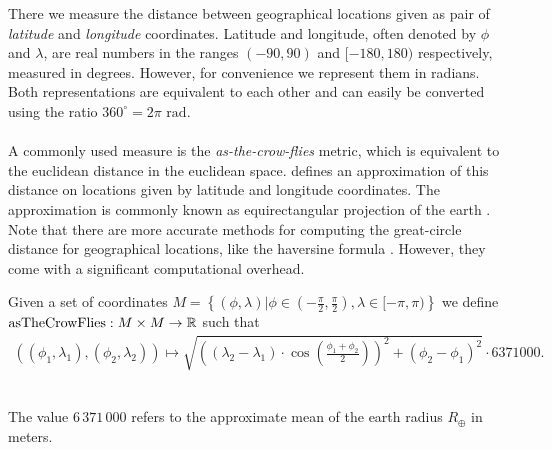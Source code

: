 	There we measure the distance between geographical locations given as pair of \textit{latitude} and \textit{longitude} coordinates.
	Latitude and longitude, often denoted by $\phi$ and $\lambda$, are real numbers in the ranges $(-90, 90)$ and $[-180, 180)$ respectively,
	measured in degrees. However, for convenience we represent them in radians. Both representations are equivalent to each other
	and can easily be converted using the ratio $360^\circ = 2 \pi \text{ rad}$.\\\\
	A commonly used measure is the \textit{as-the-crow-flies} metric, which is equivalent to the euclidean distance in the euclidean space.
	 defines an approximation of this distance on locations given by latitude and longitude coordinates.
	The approximation is commonly known as equirectangular projection of the earth .
	Note that there are more accurate methods for computing the great-circle distance for geographical locations,
	like the haversine formula . However, they come with a significant computational overhead.
	\begin{mydef}\label{asTheCrowFlies}
		Given a set of coordinates $M = \left\{(\phi, \lambda) | \phi \in \left(-\frac{\pi}{2}, \frac{\pi}{2}\right), \lambda \in [-\pi, \pi)\right\}$ we define
		$\operatorname{asTheCrowFlies}: M \times M \to \mathbb{R}$ such that
		\begin{align*}
			\left(\left(\phi_1, \lambda_1\right), \left(\phi_2, \lambda_2\right)\right) \mapsto
				\sqrt{\left(\left(\lambda_2 - \lambda_1\right) \cdot \cos\left(\frac{\phi_1 + \phi_2}{2}\right)\right)^2
					+ \left(\phi_2 - \phi_1\right)^2} \cdot 6371000.
		\end{align*}
	\end{mydef}\quad\\
	The value $6\,371\,000$ refers to the approximate mean of the earth radius $R_{\oplus}$ in meters.